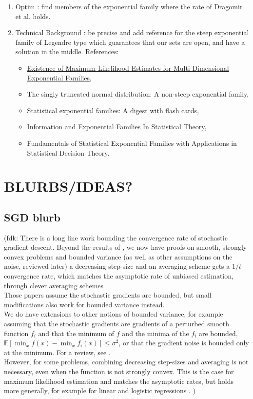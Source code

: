 \documentclass[twoside]{article}
\let\oldsection\section
\renewcommand{\section}[1]{\oldsection{\texorpdfstring{\uppercase{#1}}{#1}}}
\newcommand{\fdk}[1]{\textcolor{Periwinkle}{(fdk:#1)}}
\newcommand*{\expect}[2][]{\ensuremath{\mathbb{E}_{#1} \left[ #2 \right] }} %
\begin{document}
\begin{enumerate}
	\item Optim : find members of the exponential family where the rate of Dragomir et al. holds.
	\item Technical Background : be precise and add reference for the steep exponential family of Legendre type which guarantees that our sets are open, and have a solution in the middle.
	References: \begin{itemize}
		\item \href{https://www.jstor.org/stable/4616462?seq=1#metadata_info_tab_contents}{Existence of Maximum Likelihood Estimates for Multi-Dimensional Exponential Families},
		\item The singly truncated normal distribution: A non-steep exponential family,
		\item Statistical exponential families: A digest with flash cards,
		\item Information and Exponential Families In Statistical Theory,
		\item Fundamentals of Statistical Exponential Families with Applications in Statistical Decision Theory.
	\end{itemize}
\end{enumerate}




\section{Blurbs/ideas?}



\subsection{SGD blurb}
\fdk{
%
There is a long line work bounding the convergence rate of stochastic gradient descent.
Beyond the results of \citet{robbins1951stochastic},
we now have proofs on smooth, strongly convex problems and bounded variance
(as well as other assumptions on the noise, reviewed later)
a decreasing step-size and an averaging scheme gets
a $1/t$ convergence rate,
which matches the asymptotic rate of unbiased estimation,
through clever averaging schemes \citep{rakhlin2012making,lacostejulien2012simpler}
\\
Those papers assume the stochastic gradients are bounded,
but small modifications also work for bounded variance instead.
\\
We do have extensions to other notions of bounded variance,
for example assuming that the stochastic gradients are gradients of a perturbed smooth function $f_i$
and that the minimum of $f$ and the minima of the $f_i$
are bounded, $\expect{\min_x f(x) - \min_x f_i(x)} \leq \sigma^2$,
or that the gradient noise is bounded only at the minimum.
For a review, see \citet{gower2019sgd}.
\\
However, for some problems, combining decreasing step-sizes and averaging is not necessary,
even when the function is not strongly convex.
This is the case for maximum likelihood estimation and matches the asymptotic rates,
but holds more generally, for example for linear and logistic regressions \citep{bach2013nonstronglyconvex,moulines2011non}.
}
\end{document}

